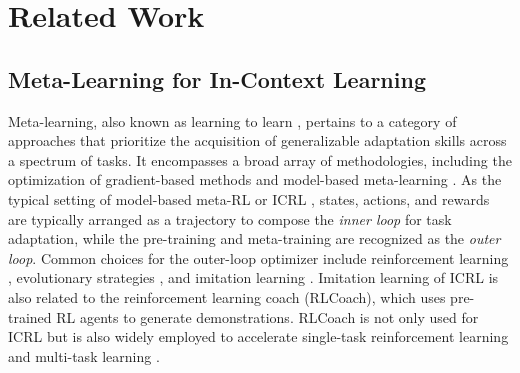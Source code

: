 \section{Related Work}
\subsection{Meta-Learning for In-Context Learning}
Meta-learning, also known as learning to learn \cite{thrun1998learning}, pertains to a category of approaches that prioritize the acquisition of generalizable adaptation skills across a spectrum of tasks. It encompasses a broad array of methodologies, including the optimization of gradient-based methods \citep{finn2017model} and model-based meta-learning \citep{santoro2016meta, duan2016rl}. As the typical setting of model-based meta-RL \cite{duan2016rl,mishra2018simple} or ICRL \cite{laskin2022context,lee2024supervised,grigsbyamago}, states, actions, and rewards are typically arranged as a trajectory to compose the \emph{inner loop} for task adaptation, while the pre-training and meta-training are recognized as the \emph{outer loop}. Common choices for the outer-loop optimizer include reinforcement learning \cite{duan2016rl, mishra2018simple, grigsbyamago}, evolutionary strategies \cite{najarro2020meta, wang2022evolving}, and imitation learning \cite{lee2024supervised, laskin2022context}. Imitation learning of ICRL is also related to the reinforcement learning coach (RLCoach), which uses pre-trained RL agents to generate demonstrations. RLCoach is not only used for ICRL but is also widely employed to accelerate single-task reinforcement learning \cite{zhang2021end} and multi-task learning \cite{reed2022generalist}.

